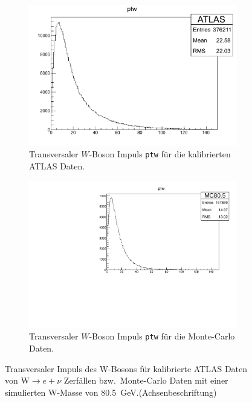 \documentclass[11pt, a4paper]{article}
\numberwithin{equation}{section}
\newcommand{\korr}[1]{{\color{red}(#1)}}
\begin{document}
\begin{figure}
	\centering
	\begin{subfigure}{.49\textwidth}
		\includegraphics[width=\textwidth]{./data/root/wmass/exercise1/ATLAS_ptw.pdf}
		\caption{Transversaler $W$-Boson Impuls \texttt{ptw} für die kalibrierten ATLAS Daten.}
	\end{subfigure}
	\begin{subfigure}{.49\textwidth}
		\includegraphics[width=\textwidth]{./data/root/wmass/exercise1/MC_ptw.pdf}
		\caption{Transversaler $W$-Boson Impuls \texttt{ptw} für die Monte-Carlo Daten.}
		\label{fig:mc_ptw}
	\end{subfigure}
	\caption{Transversaler Impuls des W-Bosons für kalibrierte ATLAS Daten von $\mathrm{W} \rightarrow e + \nu$ Zerfällen bzw.\  Monte-Carlo Daten mit einer simulierten W-Masse von \SI{80,5}{GeV}.\korr{Achsenbeschriftung}}
	\label{fig:observablen_pt2}
\end{figure}
\end{document}
